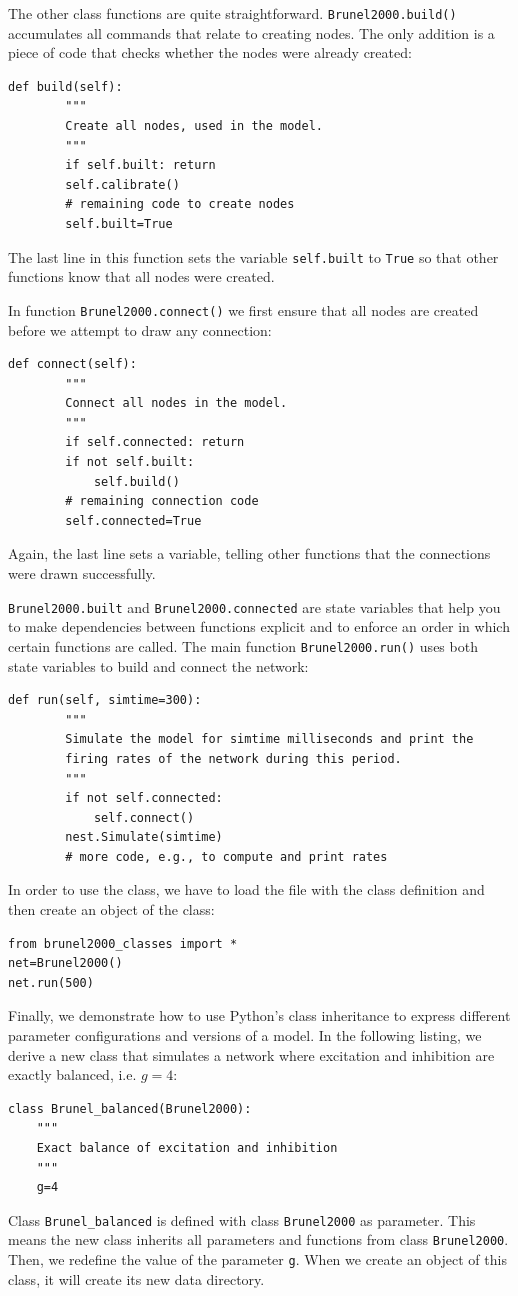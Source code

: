 \documentclass{article}
\begin{document}
The other class functions are quite straightforward. 
\lstinline!Brunel2000.build()! accumulates all commands that
relate to creating nodes. The only addition is a piece of code that
checks whether the nodes were already created:
\begin{lstlisting}[name=brunel-classes]
    def build(self):
        """
        Create all nodes, used in the model.
        """
        if self.built: return
        self.calibrate()
        # remaining code to create nodes
        self.built=True
\end{lstlisting}  
The last line in this function sets the variable
\lstinline!self.built! to \lstinline!True! so that other functions
know that all nodes were created.

In function \lstinline!Brunel2000.connect()! we first ensure that all nodes are
created before we attempt to draw any connection:
\begin{lstlisting}[name=brunel-classes]
    def connect(self):
        """
        Connect all nodes in the model.
        """
        if self.connected: return
        if not self.built:
            self.build()
        # remaining connection code
        self.connected=True
\end{lstlisting}
Again, the last line sets a variable, telling other functions that the
connections were drawn successfully.

\lstinline!Brunel2000.built! and \lstinline!Brunel2000.connected! are
state variables that help you to make dependencies between functions
explicit and to enforce an order in which certain functions are
called. The main function \lstinline!Brunel2000.run()! uses both
state variables to build and connect the network:
\begin{lstlisting}[name=brunel-classes]
    def run(self, simtime=300):
        """
        Simulate the model for simtime milliseconds and print the
        firing rates of the network during this period.  
        """
        if not self.connected:
            self.connect()
        nest.Simulate(simtime)
        # more code, e.g., to compute and print rates
\end{lstlisting}
In order to use the class, we have to load the file with the class
definition and then create an object of the class:
\begin{lstlisting}[numbers=none]
from brunel2000_classes import *
net=Brunel2000()
net.run(500)
\end{lstlisting} 
Finally, we demonstrate how to use Python's class inheritance to
express different parameter configurations and versions of a model.
In the following listing, we derive a new class that simulates a
network where excitation and inhibition are exactly balanced,
i.e. $g=4$:
\begin{lstlisting}[name=brunel-classes]
class Brunel_balanced(Brunel2000):
    """
    Exact balance of excitation and inhibition
    """
    g=4
\end{lstlisting}
Class \lstinline!Brunel_balanced! is defined with class
\lstinline!Brunel2000! as parameter. This means the new class inherits
all parameters and functions from class \lstinline!Brunel2000!. Then,
we redefine the value of the parameter \lstinline!g!. When we create
an object of this class, it will create its new data directory. 
\end{document}
